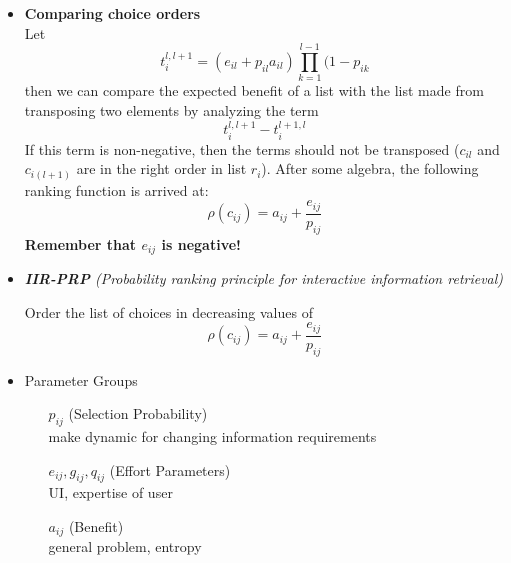 \documentclass{article}
\begin{document}
\begin{itemize}
\item {\bf Comparing choice orders} \\
    Let \[ t_i^{l,l+1} = 
        (e_{il} + p_{il}a_{il})\prod_{k=1}^{l-1}(1-p_{ik} \]
    then we can compare the expected benefit of a list with the list made from transposing two elements by analyzing the term
        \[ t_i^{l,l+1} - t_i^{l+1,l} \]
    If this term is non-negative, then the terms should not be transposed ($c_{il}$ and $c_{i(l+1)}$ are in the right order in list $r_i$).  After some algebra, the following ranking function is arrived at:
        \[ \rho(c_{ij}) = a_{ij} + \frac{e_{ij}}{p_{ij}} \]
    {\bf Remember that $e_{ij}$ is negative!}

\item {\it {\bf IIR-PRP} (\it Probability ranking principle for interactive information retrieval) }

    Order the list of choices in decreasing values of 
    \[ \rho(c_{ij}) = a_{ij} + \frac{e_{ij}}{p_{ij}} \]

\item Parameter Groups
    \begin{enumerate}
        \item[$p_{ij}$](Selection Probability) \\
            {\footnotesize make dynamic for changing information requirements}
        \item[$e_{ij}, g_{ij}, q_{ij}$](Effort Parameters) \\
            {\footnotesize UI, expertise of user}
        \item[$a_{ij}$](Benefit) \\
            {\footnotesize general problem, entropy}
    \end{enumerate}

\end{itemize}

%
\end{document}
